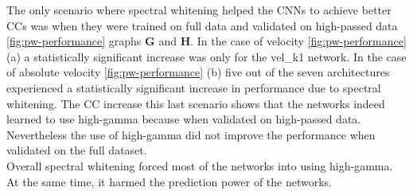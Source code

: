 The only scenario where spectral whitening helped the CNNs to achieve better CCs was when they were trained on full data and validated on high-passed data \ref{fig:pw-performance} graphs \textbf{G} and \textbf{H}. 
In the case of velocity \ref{fig:pw-performance} (a) a statistically significant increase was only for the vel\_k1 network.
In the case of absolute velocity \ref{fig:pw-performance} (b) five out of the seven architectures experienced a statistically significant increase in performance due to spectral whitening.
The CC increase this last scenario shows that the networks indeed learned to use high-gamma because when validated on high-passed data. Nevertheless the use of high-gamma did not improve the performance when validated on the full dataset.  \\

Overall spectral whitening forced most of the networks into using high-gamma. 
At the same time, it harmed the prediction power of the networks. 

